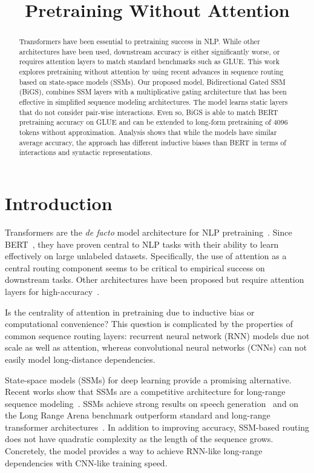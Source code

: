 \title{Pretraining Without Attention}

\begin{abstract}
Transformers have been essential to pretraining success in NLP. While other architectures have been used, downstream accuracy is either significantly worse, or requires attention layers to match standard benchmarks such as GLUE. This work explores pretraining without attention by using recent advances in sequence routing based on state-space models (SSMs). Our proposed model, Bidirectional Gated SSM (BiGS), combines SSM layers with a multiplicative gating architecture that has been effective in simplified sequence modeling architectures. The model learns static layers that do not consider pair-wise interactions. Even so, BiGS is able to match BERT pretraining accuracy on GLUE and can be extended to long-form pretraining of 4096 tokens without approximation. Analysis shows that while the models have similar average accuracy, the approach has different inductive biases than BERT in terms of interactions and syntactic representations.
\end{abstract}

\section{Introduction}

Transformers are the \emph{de facto} model architecture for NLP pretraining~\cite{vaswani2017attention}. Since BERT~\cite{devlin2018bert}, they have proven central to NLP tasks with their ability to learn effectively on large unlabeled datasets. Specifically, the use of attention as a central routing component seems to be critical to empirical success on downstream tasks. Other architectures have been proposed but require attention layers for high-accuracy~\cite{tay2020efficient,lee2021fnet}.

Is the centrality of attention in pretraining due to inductive bias or computational convenience? This question is complicated by the properties of common sequence routing layers: recurrent neural network (RNN) models due not scale as well as attention, whereas convolutional neural networks (CNNs) can not easily model long-distance dependencies. 

State-space models (SSMs) for deep learning provide a promising alternative. Recent works show that SSMs are a competitive architecture for long-range sequence modeling~\citep{gu2021efficiently}. SSMs achieve strong results on speech generation~\cite{goel2022s} and on the Long Range Arena benchmark \citep{tay2020long} outperform standard and long-range transformer architectures~\citep{gu2021efficiently, gupta2022diagonal,gu2022parameterization, smith2022simplified}. In addition to improving accuracy, SSM-based routing does not have quadratic complexity as the length of the sequence grows. Concretely, the model provides a way to achieve RNN-like long-range dependencies with CNN-like training speed. 

